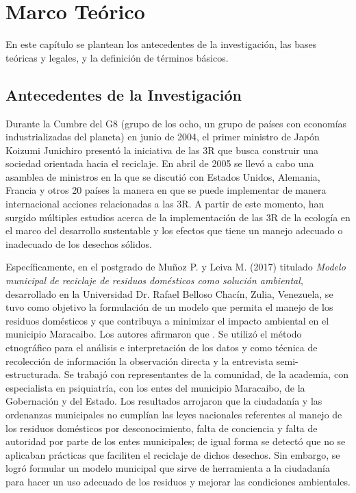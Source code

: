 \vspace*{6cm}
{\setlength{\parskip}{-0.5cm}
\chapter{Marco Teórico}
}
\newpage

En este capítulo se plantean los antecedentes de la investigación, las bases teóricas y legales, y la definición de términos básicos.

{\setlength{\parskip}{0cm}
\section{Antecedentes de la Investigación}

Durante la Cumbre del G8 (grupo de los ocho, un grupo de países con economías industrializadas del planeta) en junio de 2004, el primer ministro de Japón Koizumi Junichiro presentó la iniciativa de las 3R que busca construir una sociedad orientada hacia el reciclaje. En abril de 2005 se llevó a cabo una asamblea de ministros en la que se discutió con Estados Unidos, Alemania, Francia y otros 20 países la manera en que se puede implementar de manera internacional acciones relacionadas a las 3R. A partir de este momento, han surgido múltiples estudios acerca de la implementación de las 3R de la ecología en el marco del desarrollo sustentable y los efectos que tiene un manejo adecuado o inadecuado de los desechos sólidos.
}

Específicamente, en el postgrado de Muñoz P. y Leiva M. (2017) titulado \textit{Modelo municipal de reciclaje de residuos domésticos como solución ambiental}, desarrollado en la Universidad Dr. Rafael Belloso Chacín, Zulia, Venezuela, se tuvo como objetivo la formulación de un modelo que permita el manejo de los residuos domésticos y que contribuya a minimizar el impacto ambiental en el municipio Maracaibo. Los autores afirmaron que . Se utilizó el método etnográfico para el análisis e interpretación de los datos y como técnica de recolección de información la observación directa y la entrevista semi-estructurada. Se trabajó con representantes de la comunidad, de la academia, con especialista en psiquiatría, con los entes del municipio Maracaibo, de la Gobernación y del Estado. Los resultados arrojaron que la ciudadanía y las ordenanzas municipales no cumplían las leyes nacionales referentes al manejo de los residuos domésticos por desconocimiento, falta de conciencia y falta de autoridad por parte de los entes municipales; de igual forma se detectó que no se aplicaban prácticas que faciliten el reciclaje de dichos desechos. Sin embargo, se logró formular un modelo municipal que sirve de herramienta a la ciudadanía para hacer un uso adecuado de los residuos y mejorar las condiciones ambientales.

